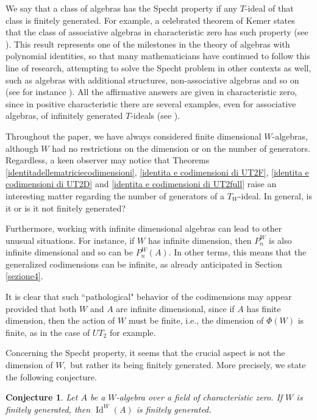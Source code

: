 \documentclass[reqno]{amsart}
\newtheorem{conjecture}[theorem]{Conjecture}
\theoremstyle{definition}
\numberwithin{equation}{section}
\numberwithin{theorem}{section}
\DeclareMathOperator{\I}{Id}
\begin{document}
We say that a class of algebras has the Specht property if any $T$-ideal of that class is finitely generated. For example, a celebrated theorem of Kemer states that the class of associative algebras in characteristic zero has such property (see \cite{Kemer1985}). This result represents one of the milestones in the theory of algebras with polynomial identities, so that many mathematicians have continued to follow this line of research, attempting to solve the Specht problem in other contexts as well, such as algebras with additional structures, non-associative algebras and so on (see for instance \cite{AljadeffGiambrunoKarasik2017, AljadeffKanel2010, VaisZelmanov1989}). All the affirmative answers are given in characteristic zero, since in positive characteristic there are several examples, even for associative algebras, of infinitely generated $T$-ideals (see \cite{Belov1999, Grishin1999, Shchigolev1999}).

Throughout the paper, we have always considered finite dimensional $W$-algebras, although $W$ had no restrictions on the dimension or on the number of generators. Regardless, a keen observer may notice that Theorems \ref{identitadellematriciecodimensioni}, \ref{identita e codimensioni di UT2F}, \ref{identita e codimensioni di UT2D} and \ref{identita e codimensioni di UT2full} raise an interesting matter regarding the number of generators of a $T_W$-ideal. In general, is it or is it not finitely generated? 

Furthermore, working with infinite dimensional algebras can lead to other unusual situations. For instance, if $W$ has infinite dimension, then $P_n^W$ is also infinite dimensional and so can be $P_n^W(A).$ In other terms, this means that the generalized codimensions can be infinite, as already anticipated in Section \ref{sezione4}.

It is clear that such ``pathological" behavior of the codimensions may appear provided that both $W$ and $A$ are infinite dimensional, since if $A$ has finite dimension, then the action of $W$ must be finite,  i.e., the dimension of $\Phi(W)$ is finite, as in the case of $UT_2$ for example. 


Concerning the Specht property, it seems that the crucial aspect is not the dimension of $W,$ but rather its being finitely generated. More precisely, we state the following conjecture.

\begin{conjecture}\label{congettura}
    Let $A$ be a $W$-algebra over a field of characteristic zero. If $W$ is finitely generated, then $\I^W(A)$ is finitely generated.
\end{conjecture}
\end{document}

